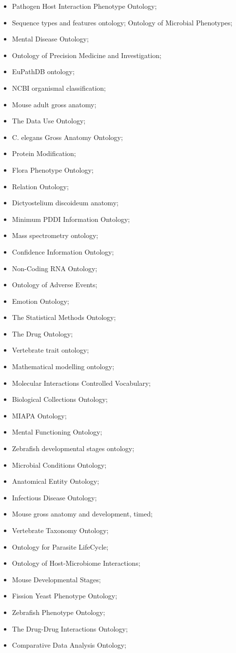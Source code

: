 \documentclass{cisfyp}
\begin{document}
\begin{appendices}
\begin{multicols}{2}
\begin{itemize}
	\item Pathogen Host Interaction Phenotype Ontology; \item Sequence types and features ontology; Ontology of Microbial Phenotypes; \item Mental Disease Ontology; \item Ontology of Precision Medicine and Investigation;
	\item EuPathDB ontology; \item NCBI organismal classification; \item Mouse adult gross anatomy; \item The Data Use Ontology; \item C. elegans Gross Anatomy Ontology; \item Protein Modification; \item Flora Phenotype Ontology; \item Relation Ontology;
	\item Dictyostelium discoideum anatomy; \item Minimum PDDI Information Ontology; \item Mass spectrometry ontology; \item Confidence Information Ontology; \item Non-Coding RNA Ontology; \item Ontology of Adverse Events;
	\item Emotion Ontology; \item The Statistical Methods Ontology; \item The Drug Ontology; \item Vertebrate trait ontology; \item Mathematical modelling ontology; \item Molecular Interactions Controlled Vocabulary; \item Biological Collections Ontology; \item MIAPA Ontology;
	\item Mental Functioning Ontology; \item Zebrafish developmental stages ontology; \item Microbial Conditions Ontology; \item Anatomical Entity Ontology; \item Infectious Disease Ontology; \item Mouse gross anatomy and development, timed; \item Vertebrate Taxonomy Ontology;
	\item Ontology for Parasite LifeCycle; \item Ontology of Host-Microbiome Interactions; \item Mouse Developmental Stages; \item Fission Yeast Phenotype Ontology; \item Zebrafish Phenotype Ontology; \item The Drug-Drug Interactions Ontology; \item Comparative Data Analysis Ontology;

\end{itemize}
\end{multicols}
\end{appendices}
\end{document}
